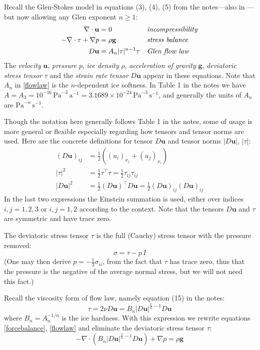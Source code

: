 \documentclass[letterpaper,final,12pt,reqno]{amsart}
\newcommand{\bg}{\mathbf{g}}
\newcommand{\bu}{\mathbf{u}}
\begin{document}
Recall the Glen-Stokes model in equations (3), (4), (5) from the notes---also in \cite{GreveBlatter2009,JouvetRappaz2011}---but now allowing any Glen exponent $n\ge 1$:
\begin{align}
\nabla \cdot \bu &= 0 &&\text{\emph{incompressibility}} \label{incompressible} \\
- \nabla \cdot \tau + \nabla p &= \rho \bg &&\text{\emph{stress balance}} \label{forcebalance} \\
D\bu &= A_n |\tau|^{n-1} \tau &&\text{\emph{Glen flow law}} \label{flowlaw}
\end{align}
The \emph{velocity} $\bu$, \emph{pressure} $p$, \emph{ice density} $\rho$, \emph{acceleration of gravity} $\bg$, \emph{deviatoric stress tensor} $\tau$ and the \emph{strain rate tensor} $D\bu$ appear in these equations.  Note that $A_n$ in \eqref{flowlaw} is the $n$-dependent ice softness.  In Table 1 in the notes we have $A = A_3 = 10^{-16} \,\text{Pa}^{-3}\,\text{a}^{-1} = 3.1689 \times 10^{-24} \,\text{Pa}^{-3}\,\text{s}^{-1}$, and generally the units of $A_n$ are $\text{Pa}^{-n}\,\text{s}^{-1}$.

Though the notation here generally follows Table 1 in the notes, some of usage is more general or flexible especially regarding how tensors and tensor norms are used.  Here are the concrete definitions for tensor $D\bu$ and tensor norms $|D\bu|$, $|\tau|$:
\begin{align*}
(D\bu)_{ij} &= \frac{1}{2} \left((u_i)_{x_j} + (u_j)_{x_i}\right) \\
|\tau|^2 &= \frac{1}{2} \tau^\top \tau = \frac{1}{2} \tau_{ij} \tau_{ij} \\
|D\bu|^2 &= \frac{1}{2} (D\bu)^\top D\bu = \frac{1}{2} (D\bu)_{ij} (D\bu)_{ij}
\end{align*}
In the last two expressions the Einstein summation is used, either over indices $i,j=1,2,3$ or $i,j=1,2$ according to the context.  Note that the tensors $D\bu$ and $\tau$ are symmetric and have trace zero.

The deviatoric stress tensor $\tau$ is the full (Cauchy) stress tensor with the pressure removed:
    $$\sigma = \tau - p\,I$$
(One may then derive $p = -\frac{1}{3} \sigma_{ii}$, from the fact that $\tau$ has trace zero, thus that the pressure is the negative of the average normal stress, but we will not need this fact.)

Recall the viscosity form of flow law, namely equation (15) in the notes:
\begin{equation}
\tau = 2\nu D\bu = B_n |D\bu|^{\frac{1}{n} - 1} D\bu  \label{viscflowlaw}
\end{equation}
where $B_n = A_n^{-1/n}$ is the ice hardness.  With this expression we rewrite equations \eqref{forcebalance}, \eqref{flowlaw} and eliminate the deviatoric stress tensor $\tau$:
\begin{equation}
- \nabla \cdot \left(B_n |D\bu|^{\frac{1}{n} - 1} D\bu\right) + \nabla p = \rho \mathbf{g} \label{stokes}
\end{equation}
\end{document}

